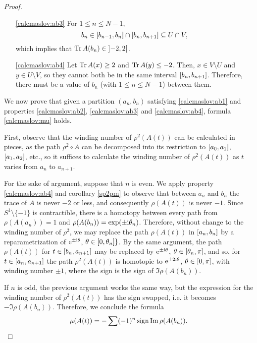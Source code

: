 \begin{proof}
\begin{itemize}
\item [\ref{calcmaslov:ab3}] For $1 \leq n \leq N-1$,
\begin{equation}
b_n \in \interval{b_{n-1}}{b_n} \cap \interval{b_n}{b_{n+1}} \subseteq U \cap V,
\end{equation}
which implies that $\trace A(b_n) \in \ointerval{-2}2$.

\item [\ref{calcmaslov:ab4}] Let $\operatorname{Tr} A(x) \geq 2$ and $\operatorname{Tr} A(y) \leq -2$. Then, $x \in V \setminus U$ and $y \in U \setminus V$, so they cannot both be in the same interval $\interval{b_n}{b_{n+1}}$. Therefore, there must be a value of $b_n$ (with $1 \leq n \leq N-1$) between them.
\end{itemize}

We now prove that given a partition $(a_n, b_n)$ satisfying \eqref{calcmaslov:ab1} and properties \ref{calcmaslov:ab2}, \ref{calcmaslov:ab3} and \ref{calcmaslov:ab4}, formula \eqref{calcmaslov:mu} holds.

First, observe that the winding number of $\rho^2(A(t))$ can be calculated in pieces, as the path $\rho^2 \circ A$ can be decomposed into its restriction to $\interval{a_0}{a_1}$, $\interval{a_1}{a_2}$, etc., so it suffices to calculate the winding number of $\rho^2(A(t))$ as $t$ varies from $a_n$ to $a_{n+1}$.

For the sake of argument, suppose that $n$ is even. We apply property \ref{calcmaslov:ab4} and corollary \ref{sp2pm} to observe that between $a_n$ and $b_n$ the trace of $A$ is never $-2$ or less, and consequently $\rho(A(t))$ is never $-1$. Since $S^1 \setminus \{-1\}$ is contractible, there is a homotopy between every path from $\rho(A(a_n)) = 1$ and $\rho(A(b_n)) = \exp(\pm \mathrm{i} \theta_n)$. Therefore, without change to the winding number of $\rho^2$, we may replace the path $\rho(A(t))$ in $\interval{a_n}{b_n}$ by a reparametrization of $\mathrm{e}^{\pm \mathrm{i} \theta}$, $\theta \in \interval 0 {\theta_n}\}$. By the same argument, the path $\rho(A(t))$ for $t \in \interval{b_n}{a_{n+1}}$ may be replaced by $\mathrm{e}^{\pm \mathrm{i} \theta}$, $\theta \in \interval{\theta_n}\pi$, and so, for $t \in \interval{a_n}{a_{n+1}}$ the path $\rho^2(A(t))$ is homotopic to $\mathrm{e}^{\pm 2 \mathrm{i} \theta}$, $\theta \in \interval 0 \pi$, with winding number $\pm 1$, where the sign is the sign of $\Im \rho(A(b_n))$.

If $n$ is odd, the previous argument works the same way, but the expression for the winding number of $\rho^2(A(t))$ has the sign swapped, i.e. it becomes $- \Im \rho(A(b_n))$. Therefore, we conclude the formula
\begin{equation}
\mu(A(t)) = -\sum (-1)^n \operatorname{sign} \operatorname{Im} \rho(A(b_n)).
\end{equation}


\end{proof}
